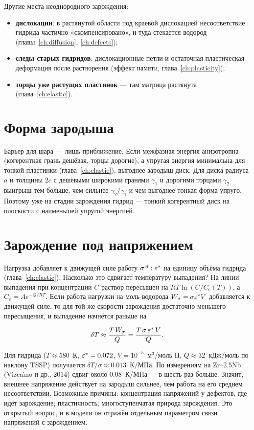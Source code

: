 
Другие места неоднородного зарождения:
\begin{itemize}
\item \textbf{дислокации}: в растянутой области под краевой дислокацией несоответствие гидрида частично
  «скомпенсировано», и туда стекается водород (главы~\ref{ch:diffusion}, \ref{ch:defects});
\item \textbf{следы старых гидридов}: дислокационные петли и остаточная пластическая деформация после растворения
  (эффект памяти, глава~\ref{ch:plasticity});
\item \textbf{торцы уже растущих пластинок} --- там матрица растянута (глава~\ref{ch:elastic}).
\end{itemize}

\section{Форма зародыша}

Барьер для шара --- лишь приближение. Если межфазная энергия анизотропна (когерентная грань дешёвая, торцы
дорогие), а упругая энергия минимальна для тонкой пластинки (глава~\ref{ch:elastic}), выгоднее зародыш-диск. Для диска радиуса $a$
и толщины $2c$ с дешёвыми широкими гранями $\gamma_1$ и дорогими торцами $\gamma_2$ выигрыш тем больше, чем
сильнее $\gamma_2/\gamma_1$ и чем выгоднее тонкая форма упруго. Поэтому уже на стадии зарождения гидрид ---
тонкий когерентный диск на плоскости с наименьшей упругой энергией.

\section{Зарождение под напряжением}

Нагрузка добавляет к движущей силе работу $\sigma^A:\varepsilon^*$ на единицу объёма гидрида (глава~\ref{ch:elastic}). Насколько это
сдвигает температуру выпадения? На линии выпадения при концентрации $C$ раствор пересыщен на
$RT\ln(C/C_e(T))$, а $C_e = Ae^{-Q/RT}$. Если работа нагрузки на моль водорода $W_\sigma = \sigma\varepsilon^*V$
добавляется к движущей силе, то для той же скорости зарождения достаточно меньшего пересыщения, и выпадение
начнётся раньше на
\begin{keyf}
\[
\delta T \approx \frac{T\,W_\sigma}{Q} = \frac{T\,\sigma\,\varepsilon^*\,V}{Q}.
\]
\end{keyf}
Для гидрида ($T\approx580$~К, $\varepsilon^* = 0.072$, $V = 10^{-5}$~м$^3$/моль H, $Q\approx32$~кДж/моль по наклону TSSP)
получается $\delta T/\sigma\approx0.013$~К/МПа. По измерениям на Zr--2.5Nb (Vizca\'{\i}no и др., 2014) сдвиг около
0.08~К/МПа --- в шесть раз больше. Значит, внешнее напряжение действует на зародыш сильнее, чем работа на его
среднем несоответствии. Возможные причины: концентрация напряжений у дефектов, где идёт зарождение;
пластичность; многоступенчатая природа зарождения. Это открытый вопрос, и в модели он отражён отдельным
параметром связи напряжений с зарождением.

